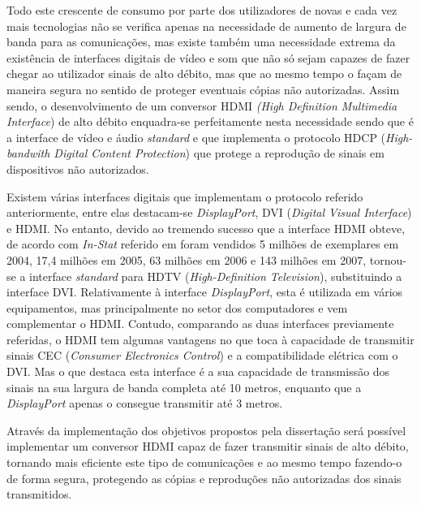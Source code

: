 Todo este crescente de consumo por parte dos utilizadores de novas e cada vez mais tecnologias não se verifica apenas na necessidade de aumento de largura de banda para as comunicações, mas existe também uma necessidade extrema da existência de interfaces digitais de vídeo e som que não só sejam capazes de fazer chegar ao utilizador sinais de alto débito, mas que ao mesmo tempo o façam de maneira segura no sentido de proteger eventuais cópias não autorizadas. Assim sendo, o desenvolvimento de um conversor HDMI \textit{(High Definition Multimedia Interface}) de alto débito enquadra-se perfeitamente nesta necessidade sendo que é a interface de vídeo e áudio \textit{standard} e que implementa o protocolo HDCP (\textit{High-bandwith Digital Content Protection}) que protege a reprodução de sinais em dispositivos não autorizados.

Existem várias interfaces digitais que implementam o protocolo referido anteriormente, entre elas destacam-se \textit{DisplayPort}, DVI (\textit{Digital Visual Interface}) e HDMI. No entanto, devido ao tremendo sucesso que a interface HDMI obteve, de acordo com \textit{In-Stat} referido em \cite{R002} foram vendidos 5 milhões de exemplares em 2004, 17,4 milhões em 2005, 63 milhões em 2006 e 143 milhões em 2007, tornou-se a interface \textit{standard} para HDTV (\textit{High-Definition Television}), substituindo a interface DVI. Relativamente à interface \textit{DisplayPort}, esta é utilizada em vários equipamentos, mas principalmente no setor dos computadores e vem complementar o HDMI. Contudo, comparando as duas interfaces previamente referidas, o HDMI tem algumas vantagens no que toca à capacidade de transmitir sinais CEC (\textit{Consumer Electronics Control}) e a compatibilidade elétrica com o DVI. Mas o que destaca esta interface é a sua capacidade de transmissão dos sinais na sua largura de banda completa até 10 metros, enquanto que a \textit{DisplayPort} apenas o consegue transmitir até 3 metros.

Através da implementação dos objetivos propostos pela dissertação será possível implementar um conversor HDMI capaz de fazer transmitir sinais de alto débito, tornando mais eficiente este tipo de comunicações e ao mesmo tempo fazendo-o de forma segura, protegendo as cópias e reproduções não autorizadas dos sinais transmitidos.
 

